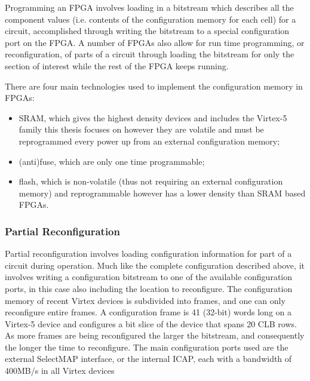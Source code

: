 \documentclass[12pt,final,oneside]{dwThesis} %
\begin{document}
   Programming an \ac{FPGA} involves loading in a bitstream which describes all the component values (i.e. contents of the configuration memory for each cell) for a circuit, accomplished through writing the bitstream to a special configuration port on the \ac{FPGA}. A number of \acp{FPGA} also allow for run time programming, or reconfiguration, of parts of a circuit through loading the bitstream for only the section of interest while the rest of the \ac{FPGA} keeps running.

   There are four main technologies used to implement the configuration memory in \acp{FPGA}:
   \begin{itemize}
      \item \ac{SRAM}, which gives the highest density devices and includes the Virtex-5 family this thesis focuses on however they are volatile and must be reprogrammed every power up from an external configuration memory;
      \item (anti)fuse, which are only one time programmable;
      \item flash, which is non-volatile (thus not requiring an external configuration memory) and reprogrammable however has a lower density than \ac{SRAM} based \acp{FPGA}\cite{FPGAArch}.
   \end{itemize}
   \subsubsection{Partial Reconfiguration}
   Partial reconfiguration involves loading configuration information for part of a circuit during operation. Much like the complete configuration described above, it involves writing a configuration bitstream to one of the available configuration ports, in this case also including the location to reconfigure. The configuration memory of recent Virtex devices is subdivided into frames, and one can only reconfigure entire frames. A configuration frame is 41 (32-bit) words long on a Virtex-5 device and configures a bit slice of the device that spans 20 \ac{CLB} rows. As more frames are being reconfigured the larger the bitstream, and consequently the longer the time to reconfigure. The main configuration ports used are the external SelectMAP interface, or the internal \ac{ICAP}, each with a bandwidth of 400MB/s in all Virtex devices \cite{XCell33,DiesselChange}
\end{document}
